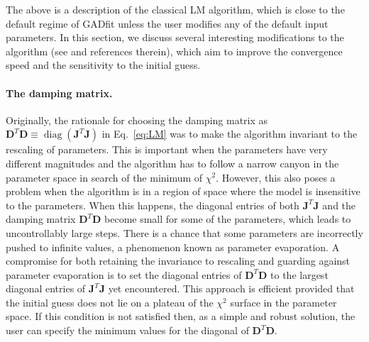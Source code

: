 \documentclass{article}
\DeclareMathOperator{\diag}{diag}
\begin{document}
The above is a description of the classical LM algorithm, which is close to the default regime of GADfit unless the user modifies any of the default input parameters. In this section, we discuss several interesting modifications to the algorithm (see \cite{transtrum10, transtrum11, transtrum12} and references therein), which aim to improve the convergence speed and the sensitivity to the initial guess.

\paragraph{The damping matrix.} Originally, the rationale for choosing the damping matrix as $\bm D^T\bm D \equiv \diag(\bm J^T\bm J)$ in Eq.~\eqref{eq:LM} was to make the algorithm invariant to the rescaling of parameters. This is important when the parameters have very different magnitudes and the algorithm has to follow a narrow canyon in the parameter space in search of the minimum of $\chi^2$. However, this also poses a problem when the algorithm is in a region of space where the model is insensitive to the parameters. When this happens, the diagonal entries of both $\bm J^T\bm J$ and the damping matrix $\bm D^T\bm D$ become small for some of the parameters, which leads to uncontrollably large steps. There is a chance that some parameters are incorrectly pushed to infinite values, a phenomenon known as parameter evaporation. A compromise for both retaining the invariance to rescaling and guarding against parameter evaporation is to set the diagonal entries of $\bm D^T\bm D$ to the largest diagonal entries of $\bm J^T\bm J$ yet encountered. This approach is efficient provided that the initial guess does not lie on a plateau of the $\chi^2$ surface in the parameter space. If this condition is not satisfied then, as a simple and robust solution, the user can specify the minimum values for the diagonal of $\bm D^T\bm D$.
\end{document}
